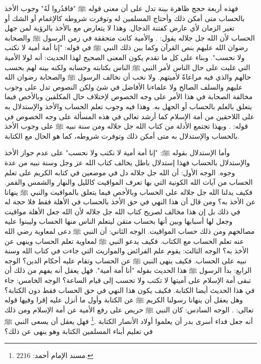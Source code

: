 فهذه أربعة حجج ظاهرة بينة تدل على أن معنى قوله ﷺ "فاقدُروا لَهُ" وجوب الأخذ بالحساب  متى أمكن ذلك وأحتاج المسلمين له وتوفرت شروطه كالإغمام أو الشك أو تغير الزمان لأي عارض كفتنة الدجال. وهذا لا يتعارض مع بالأخذ بالرؤية لمن جهل الحساب لأن الله جل جلاله يقول: \quranayah*[22][78][8-14] {\footnotesize (\surahname*[22])}. والأمية كانت متحققة في زمن الرسول ﷺ والصحابة رضوان الله عليهم بنص القرآن وكما بين ذلك النبي ﷺ في قوله: "إنا أمة أمية لا نكتب ولا نحسب". وبناء على كل ما تقدم يكون المعنى الصحيح لهذا الحديث: أنه لولا الأمية التي غلبت على حال الناس لأمر النبي ﷺ الناس بكتابته وحسابه ولكنه بينه لهم بحسب حالهم والذي فيه مراعاةً لأميتهم. ولا نحب أن نخالف الرسول ﷺ والصحابة رضوان الله عليهم والسلف الصالح ولا علماءنا الأفاضل في شئ ولكن النصوص تدل على وجوب مخالفة الصحابة في هذا الأمر على وجه الخصوص لإختلاف حال المكلفين وبالأخص فيما يتعلق بالعلم بالحساب أو الجهل به. وهذا فيه وجوب تعلم الحساب والأخذ والإستدلال به على اللاحقين من أمة الإسلام كما أرشد تعالى في هذه المسألة على وجه الخصوص في قوله: \quranayah*[10][5] {\footnotesize (\surahname*[10])}. وبهذا تجتمع الأدلة من كتاب الله جل جلاله ومن سنة نبيه ﷺ على وجوب الأخذ بالحساب والإستدلال به متى أمكن ذلك وتوفرت شروطه، كما هو الحال مع الكتابة.

وأما الإستدلال بقوله ﷺ: "إنا أمة أمية لا نكتب ولا نحسب" على عدم جواز الأخذ والإستدلال بالحساب فهذا إستدلال باطل يخالف كتاب الله عز وجل وسنة نبيه من عدة وجوه. الوجه الأول: أن الله جل جلاله دل في موضعين في كتابه الكريم على تعلم الحساب من آيات الله الكونية التي بها تعرف المواقيت كالليل والنهار والشمس والقمر. فكيف يدلنا الله جل جلاله على الحساب وبالأخص فيما يتعلق بالمواقيت والنبي ﷺ ينهانا عن الأخذ به؟ ومن قال أن هذا النهي في حق الأخذ بالحساب في الأهلة فقط فلا حجة له في ذلك بل إن هذا مخالف لصريح كتاب الله جل جلاله لأن الله جعل الأهلة مواقيت وجعل لها أسبابها وبين أنها بحساب متقن ليتعلم الناس منها الحساب وليبنوا عليه مصالحهم ومن ذلك حساب المواقيت. الوجه الثاني: أن النبي ﷺ دعى لمعاوية رضي الله عنه تعلم الحساب مع الكتاب. فكيف يدعو النبي ﷺ لمعاوية تعلم الحساب وينهى عن الأخذ به؟ الوجه الثالث: يقوم علم الفرائض والمواريث التي جاءت في كتاب الله وسنة نبيه على الحساب. فكيف ينهى النبي ﷺ عن الحساب وتقام عليه أحكام الدين؟ الوجه الرابع: بدأ الرسول ﷺ هذا الحديث بقوله "أنا أمة أمية". فهل يعقل أنه يفهم من ذلك أن تبقى أمة الإسلام على أميتها لا تكتب ولا تحسب إلى قيام الساعة؟ الوجه الخامس: جاء في هذا الحديث أيضا الكتابة. فكيف يكون هذا النهي في حق الحساب فقط دون الكتابة؟ وهل يعقل أن ينهانا رسولنا الكريم ﷺ عن الكتابة وأول ما أنزل عليه إقرا وفيها قوله تعالى: \quranayah*[96][4-5] {\footnotesize (\surahname*[96])}. الوجه السادس: كان النبي ﷺ حريص على رفع الأمية عن أمة الإسلام ومن ذلك أنه جعل فداء أسرى بدر أن يعلموا أولاد الأنصار الكتابة \href{https://shamela.ws/book/25794/1602#p1}{\faExternalLink} \cite{ahmid}.\footnote{مسند الإمام أحمد: 2216.} فهل يعقل أن يسعى النبي ﷺ  في تعليم أبناء المسلمين الكتابة وهو ينهى عن ذلك؟ 

